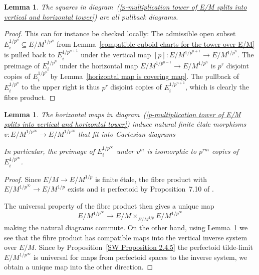 \documentclass[10pt,oneside]{amsart}
\newtheorem{lemma}[theorem]{Lemma}
\theoremstyle{definition}
\begin{document}
	
	\begin{lemma}\label{squares in double tower are pullbacks}
		The squares in diagram~(\ref{p-multiplication tower of E/M splits into vertical and horizontal tower}) are all pullback diagrams.
		\begin{center}
		\end{center}
	\end{lemma}
	\begin{proof}
		This can for instance be checked locally: The admissible open subset $E_i^{1/p^n}\subseteq E/M^{1/p^n}$ from Lemma~\ref{compatible cuboid charts for the tower over E/M} is pulled back to $E_i^{1/p^{n+1}}$ under the vertical map $[p]:E/M^{1/p^{n+1}}\rightarrow E/M^{1/p^n}$. The preimage of $E_i^{1/p^n}$ under the horizontal map $E/M^{1/p^{n-1}}\rightarrow E/M^{1/p^n}$ is $p^r$ disjoint copies of $E_i^{1/p^n}$ by Lemma~\ref{horizontal map is covering map}. The pullback of $E_i^{1/p^n}$ to the upper right is thus $p^r$ disjoint copies of $E_i^{1/p^{n+1}}$, which is clearly the fibre product.
	\end{proof}
	\begin{lemma}\label{horizontal etale map pulls back to vertical limit}
	The horizontal maps in diagram~(\ref{p-multiplication tower of E/M splits into vertical and horizontal tower}) induce natural finite \'etale morphisms $v:E/M^{1/p^\infty}\rightarrow E/M^{1/p^\infty}$ that fit into Cartesian diagrams
	\begin{center}
	\end{center}
	In particular, the preimage of $E_i^{1/p^\infty}$ under $v^m$ is isomorphic to $p^{rm}$ copies of $E_i^{1/p^\infty}$.
	\end{lemma}
	\begin{proof}
		Since $E/M \rightarrow E/M^{1/p}$ is finite \'etale, the fibre product with $E/M^{1/p^\infty} \rightarrow E/M^{1/p}$ exists and is perfectoid by Proposition~7.10 of \cite{perfectoid}.
		
		The universal property of the fibre product then gives a unique map 
		\[E/M^{1/p^\infty}\rightarrow E/M\times_ {E/M^{1/p}}E/M^{1/p^\infty}\]
		making the natural diagrams commute.
		On the other hand, using Lemma~\ref{squares in double tower are pullbacks} we see that the fibre product has compatible maps into the vertical inverse system over $E/M$. Since by Proposition~\ref{SW Proposition 2.4.5} the perfectoid tilde-limit $E/M^{1/p^\infty}$ is universal for maps from perfectoid spaces to the inverse system, we obtain a unique map into the other direction.
	\end{proof}
\end{document}
